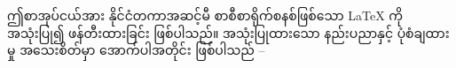 \documentclass[11pt, a4paper, openany]{book} %
\begin{document}
\chapter*{}

\begin{myanmar}
ဤစာအုပ်ငယ်အား နိုင်ငံတကာအဆင့်မီ စာစီစာရိုက်စနစ်ဖြစ်သော LaTeX ကို အသုံးပြု၍ ဖန်တီးထားခြင်း ဖြစ်ပါသည်။ အသုံးပြုထားသော နည်းပညာနှင့် ပုံစံချထားမှု အသေးစိတ်မှာ အောက်ပါအတိုင်း ဖြစ်ပါသည် --
\end{myanmar}

\vspace{1.5em}
\end{document}
